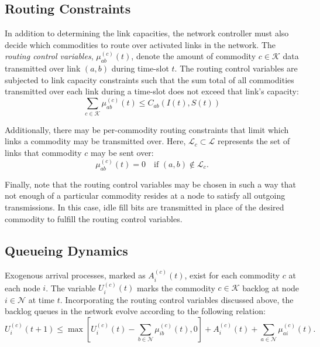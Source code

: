 \documentclass{article}
\begin{document}
\subsection{Routing Constraints}\label{sec:theory-routing-constraints}

In addition to determining the link capacities, the network controller must also decide which commodities to route over activated links in the network.
The \emph{routing control variables}, \(\mu_{ab}^{(c)}(t)\), denote the amount of commodity \(c \in \mathcal{K}\) data transmitted over link \((a,b)\) during time-slot \(t\).
The routing control variables are subjected to link capacity constraints such that the sum total of all commodities transmitted over each link during a time-slot does not exceed that link's capacity:
%
\begin{equation}
\label{eq:link-cap-constraint}
\sum_{c\in\mathcal{K}}\mu_{ab}^{(c)}(t) \leq C_{ab}(I(t),S(t))
\end{equation}


Additionally, there may be per-commodity routing constraints that limit which links a commodity may be transmitted over.
Here, \(\mathcal{L}_c \subset \mathcal{L}\) represents the set of links that commodity \(c\) may be sent over:
%
\begin{equation}
\label{eq:link-routing-constraint}
\mu_{ab}^{(c)}(t) = 0 \quad \textrm{if } (a,b) \notin \mathcal{L}_c.
\end{equation}


Finally, note that the routing control variables may be chosen in such a way that not enough of a particular commodity resides at a node to satisfy all outgoing transmissions.
In this case, idle fill bits are transmitted in place of the desired commodity to fulfill the routing control variables.


\subsection{Queueing Dynamics}\label{sec:theory-queueing}

Exogenous arrival processes, marked as \(A_{i}^{(c)}(t)\), exist for each commodity \(c\) at each node \(i\).
The variable \(U_i^{(c)}(t)\) marks the commodity \(c \in \mathcal{K}\) backlog at node \(i \in \mathcal{N}\) at time \(t\).
Incorporating the routing control variables discussed above, the backlog queues in the network evolve according to the following relation:
%
\begin{equation}
\label{eq:queue-evolution}
U_{i}^{(c)}(t+1) \leq \max\left[U_{i}^{(c)}(t) - \sum_{b\in\mathcal{N}}\mu_{ib}^{(c)}(t),0\right] + A_{i}^{(c)}(t) + \sum_{a\in\mathcal{N}}\mu_{ai}^{(c)}(t).
\end{equation}
\end{document}
